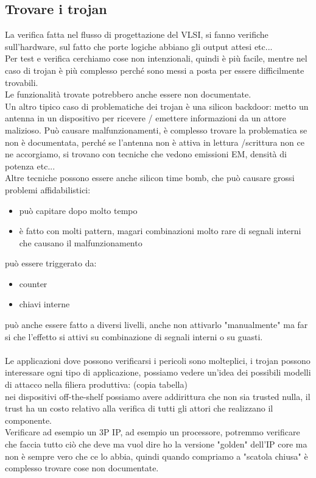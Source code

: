 \documentclass[oneside, 12pt]{extbook}
\begin{document}
\subsection{Trovare i trojan}
La verifica fatta nel flusso di progettazione del VLSI, si fanno verifiche sull'hardware, sul fatto che porte logiche abbiano gli output attesi etc...\\Per test e verifica cerchiamo cose non intenzionali, quindi è più facile, mentre nel caso di trojan è più complesso perché sono messi a posta per essere difficilmente trovabili.\\Le funzionalità trovate potrebbero anche essere non documentate.\\Un altro tipico caso di problematiche dei trojan è una silicon backdoor: metto un antenna in un dispositivo per ricevere / emettere informazioni da un attore malizioso. Può causare malfunzionamenti, è complesso trovare la problematica se non è documentata, perché se l'antenna non è attiva in lettura /scrittura non ce ne accorgiamo, si trovano con tecniche che vedono emissioni EM, densità di potenza etc...\\Altre tecniche possono essere anche silicon time bomb, che può causare grossi problemi affidabilistici:
\begin{itemize}
	\item può capitare dopo molto tempo
	\item è fatto con molti pattern, magari combinazioni molto rare di segnali interni che causano il malfunzionamento
\end{itemize}
può essere triggerato da:
\begin{itemize}
	\item counter
	\item chiavi interne
\end{itemize}
può anche essere fatto a diversi livelli, anche non attivarlo "manualmente" ma far si che l'effetto si attivi su combinazione di segnali interni o su guasti.\\\\Le applicazioni dove possono verificarsi i pericoli sono molteplici, i trojan possono interessare ogni tipo di applicazione, possiamo vedere un'idea dei possibili modelli di attacco nella filiera produttiva: (copia tabella)\\nei dispositivi off-the-shelf possiamo avere addirittura che non sia trusted nulla, il trust ha un costo relativo alla verifica di tutti gli attori che realizzano il componente.\\Verificare ad esempio un 3P IP, ad esempio un processore, potremmo verificare che faccia tutto ciò che deve ma vuol dire ho la versione "golden" dell'IP core ma non è sempre vero che ce lo abbia, quindi quando compriamo a "scatola chiusa" è complesso trovare cose non documentate.
\end{document}
